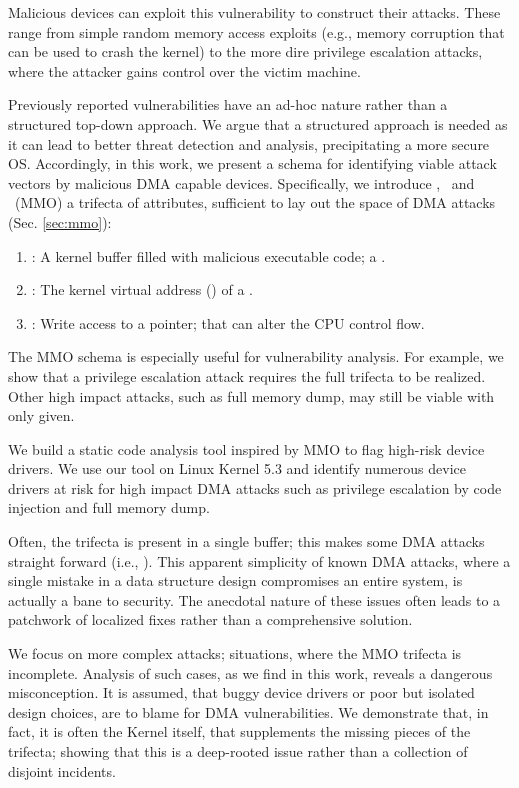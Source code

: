 Malicious devices can exploit this vulnerability to construct their attacks. These range from simple random memory access exploits (e.g., memory corruption that can be used to crash the kernel) to the more dire privilege escalation attacks, where the attacker gains control over the victim machine.

Previously reported vulnerabilities have an ad-hoc nature \cite{thunder,MMT16,Ben17b} rather than a structured top-down approach. We argue that a structured approach is needed as it can lead to better threat detection and analysis, precipitating a more secure OS. Accordingly, in this work, we present a schema for identifying viable attack vectors by malicious DMA capable devices. Specifically, we introduce \means,~\motivation{} and \oportunity~(MMO) a trifecta of attributes, sufficient to lay out the space of DMA attacks (Sec. \ref{sec:mmo}):
\begin{enumerate}
    \item \motivation: A kernel buffer filled with malicious executable code; a \mabaf.
    \item \means: The kernel virtual address (\kva) of a \mabaf.
    \item \oportunity: Write access to a pointer; that can alter the CPU control flow.
\end{enumerate} 

The MMO schema is especially useful for vulnerability analysis. For example, we show that a privilege escalation attack requires the full trifecta to be realized. Other high impact attacks, such as full memory dump, may still be viable with only \oportunity{} given. 

We build a static code analysis tool inspired by MMO to flag high-risk device drivers. We use our tool on Linux Kernel 5.3 and identify numerous device drivers at risk for high impact DMA attacks such as privilege escalation by code injection and full memory dump. 

Often, the trifecta is present in a single buffer; this makes some DMA attacks straight forward (i.e., \simple{}). This apparent simplicity of known DMA attacks, where a single mistake in a data structure design compromises an entire system, is actually a bane to security. The anecdotal nature of these issues often leads to a patchwork of localized fixes rather than a comprehensive solution. 

We focus on more complex attacks; situations, where the MMO trifecta is incomplete. Analysis of such cases, as we find in this work, reveals a dangerous misconception. It is assumed, that buggy device drivers or poor but isolated design choices, are to blame for DMA vulnerabilities. We demonstrate that, in fact, it is often the Kernel itself, that supplements the missing pieces of the trifecta; showing that this is a deep-rooted issue rather than a collection of disjoint incidents.

